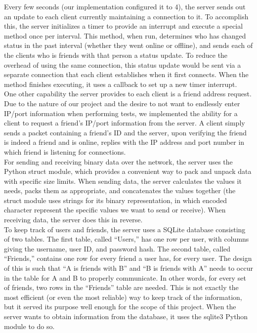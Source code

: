 \documentclass[9pt,twocolumn]{article}
\begin{document}
Every few seconds (our implementation configured it to 4), the server sends out an
update to each client currently maintaining a connection to it. To accomplish this,
the server initializes a timer to provide an interrupt and execute a special method
once per interval. This method, when run, determines who has changed status in the past
interval (whether they went online or offline), and sends each of the clients who is
friends with that person a status update. To reduce the overhead of using the same
connection, this status update would be sent via a separate connection that each client
establishes when it first connects. When the method finishes executing, it uses a callback
to set up a new timer interrupt. \\

One other capability the server provides to each client is a friend address request. Due to
the nature of our project and the desire to not want to endlessly enter IP/port information
when performing tests, we implemented the ability for a client to request a friend's IP/port
information from the server. A client simply sends a packet containing a friend's ID and the
server, upon verifying the friend is indeed a friend and is online, replies with the
IP address and port number in which friend is listening for connections. \\

For sending and receiving binary data over the network, the server uses the Python struct
module, which provides a convenient way to pack and unpack data with specific size
limits. When sending data, the server calculates the values it needs, packs them as
appropriate, and concatenates the values together (the struct module uses strings
for its binary representation, in which encoded character represent the specific values
we want to send or receive). When receiving data, the server does this in reverse. \\

To keep track of users and friends, the server uses a SQLite database consisting of
two tables. The first table, called ``Users,'' has one row per user, with columns
giving the username, user ID, and password hash. The second table, called ``Friends,''
contains one row for every friend a user has, for every user. The design of this is such
that ``A is friends with B'' and ``B is friends with A'' needs to occur in the table
for A and B to properly communicate. In other words, for every set of friends, two rows
in the ``Friends'' table are needed. This is not exactly the most efficient (or even the
most reliable) way to keep track of the information, but it served its purpose well enough
for the scope of this project. When the server wants to obtain information from the
database, it uses the sqlite3 Python module to do so. \\
\end{document}
